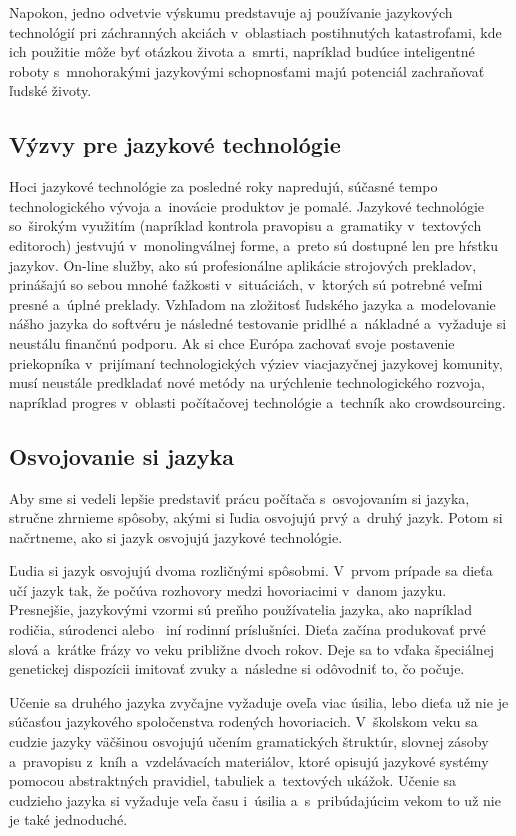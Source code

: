 \begin{multicols}{2}
Napokon, jedno odvetvie výskumu predstavuje aj používanie jazykových technológií pri záchranných akciách v~oblastiach postihnutých katastrofami, kde ich použitie môže byť otázkou života a~smrti, napríklad budúce inteligentné roboty s~mnohorakými jazykovými schopnosťami majú potenciál zachraňovať ľudské životy.

\subsection{Výzvy pre jazykové technológie}
Hoci jazykové technológie za posledné roky napredujú, súčasné tempo technologického vývoja a~inovácie produktov je pomalé. Jazykové technológie so~širokým využitím (napríklad kontrola pravopisu a~gramatiky v~textových editoroch) jestvujú v~monolingválnej forme, a~preto sú dostupné len pre hŕstku jazykov. On-line služby, ako sú profesionálne aplikácie strojových prekladov, prinášajú so sebou mnohé ťažkosti v~situáciách, v~ktorých sú potrebné veľmi presné a~úplné preklady. Vzhľadom na zložitosť ľudského jazyka a~modelovanie nášho jazyka do softvéru je následné testovanie pridlhé a~nákladné a~vyžaduje si neustálu finančnú podporu. Ak si chce Európa zachovať svoje postavenie priekopníka v~prijímaní technologických výziev viacjazyčnej jazykovej komunity, musí neustále predkladať nové metódy na urýchlenie technologického rozvoja, napríklad progres v~oblasti počítačovej technológie a~techník ako crowdsourcing.


\subsection{Osvojovanie si jazyka}
Aby sme si vedeli lepšie predstaviť prácu počítača s~osvojovaním si jazyka, stručne zhrnieme spôsoby, akými si ľudia osvojujú prvý a~druhý jazyk. Potom si načrtneme, ako si jazyk osvojujú jazykové technológie. 

Ľudia si jazyk osvojujú dvoma rozličnými spôsobmi. V~prvom prípade sa dieťa učí jazyk tak, že počúva rozhovory medzi hovoriacimi v~danom jazyku. Presnejšie, jazykovými vzormi sú preňho používatelia jazyka, ako napríklad rodičia, súrodenci alebo ~iní rodinní príslušníci. Dieťa začína produkovať prvé slová a~krátke frázy vo veku približne dvoch rokov. Deje sa to vďaka špeciálnej genetickej dispozícii imitovať zvuky a~následne si odôvodniť to, čo počuje.

Učenie sa druhého jazyka zvyčajne vyžaduje oveľa viac úsilia, lebo dieťa už nie je súčasťou jazykového spoločenstva rodených hovoriacich. V~školskom veku sa cudzie jazyky väčšinou osvojujú učením gramatických štruktúr, slovnej zásoby a~pravopisu z~kníh a~vzdelávacích materiálov, ktoré opisujú jazykové systémy pomocou abstraktných pravidiel, tabuliek a~textových ukážok. Učenie sa cudzieho jazyka si vyžaduje veľa času i~úsilia a~s~pribúdajúcim vekom to už nie je také jednoduché.


\end{multicols}
